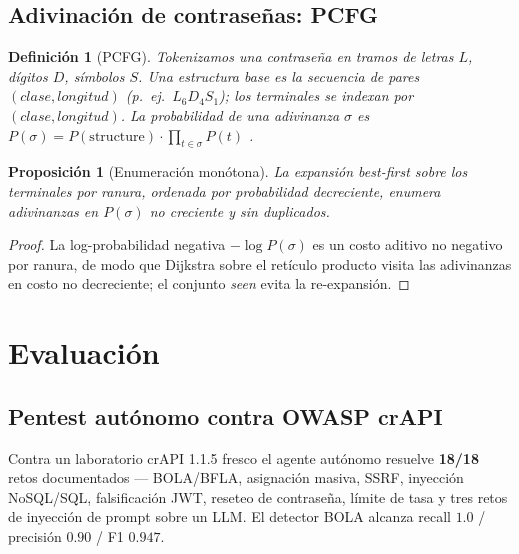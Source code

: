 \documentclass[journal]{IEEEtran}
\newtheorem{definition}{Definición}
\newtheorem{proposition}{Proposición}
\begin{document}
\subsection{Adivinación de contraseñas: PCFG}
\begin{definition}[PCFG]
\label{def:pcfg}
Tokenizamos una contraseña en tramos de letras $L$, dígitos $D$, símbolos $S$. Una
\emph{estructura base} es la secuencia de pares $(clase,longitud)$ (p.\ ej.\
$L_6D_4S_1$); los terminales se indexan por $(clase,longitud)$. La probabilidad de
una adivinanza $\sigma$ es
$P(\sigma)=P(\mathrm{structure})\cdot\prod_{t\in\sigma}P(t)$ \cite{weir2009}.
\end{definition}
\begin{proposition}[Enumeración monótona]
\label{prop:pcfg}
La expansión best-first sobre los terminales por ranura, ordenada por probabilidad
decreciente, enumera adivinanzas en $P(\sigma)$ no creciente y sin duplicados.
\end{proposition}
\begin{proof}
La log-probabilidad negativa $-\log P(\sigma)$ es un costo aditivo no negativo por
ranura, de modo que Dijkstra sobre el retículo producto visita las adivinanzas en
costo no decreciente; el conjunto \emph{seen} evita la re-expansión. \qedhere
\end{proof}

\section{Evaluación}
\label{sec:eval}

\subsection{Pentest autónomo contra OWASP crAPI}
Contra un laboratorio crAPI 1.1.5 fresco el agente autónomo resuelve
\textbf{18/18} retos documentados --- BOLA/BFLA, asignación masiva, SSRF, inyección
NoSQL/SQL, falsificación JWT, reseteo de contraseña, límite de tasa y tres retos de
inyección de prompt sobre un LLM. El detector BOLA alcanza recall $1.0$ /
precisión $0.90$ / F1 $0.947$.
\end{document}
